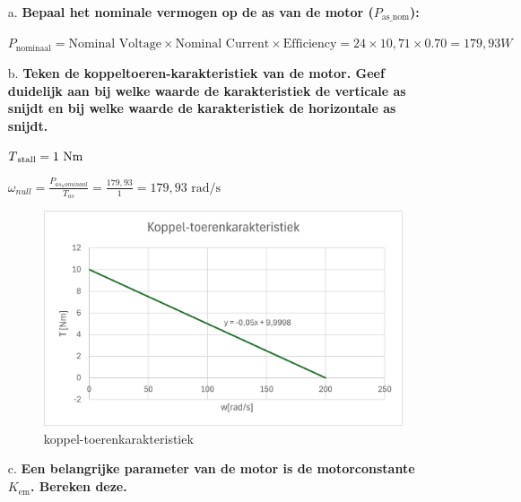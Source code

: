 \begin{enumerate}
    \item [a.] \textbf{Bepaal het nominale vermogen op de as van de motor ($P_{\text{as\_nom}}$):}
    
        $P_{\text{nominaal}} = \text{Nominal Voltage} \times \text{Nominal Current} \times \text{Efficiency} = 24 \times 10,71 \times 0.70 = 179,93W$



    \item [b.] \textbf{Teken de koppeltoeren-karakteristiek van de motor. Geef duidelijk aan bij
    welke waarde de karakteristiek de verticale as snijdt en bij welke waarde de
    karakteristiek de horizontale as snijdt.}


        $T\textsubscript{stall} = 1 \text{ Nm}$

        $\omega_{null} = \frac{P_{as_nominaal}}{T_{as}} = \frac{179,93}{1} = 179,93 \text{ rad/s}$

        \begin{figure}[h]
            \centering
            \includegraphics[scale=0.7]{koppel-toerenkarakteristiek 1b.png}
            \caption{koppel-toerenkarakteristiek}
        \end{figure}

    \item [c.] \textbf{Een belangrijke parameter van de motor is de motorconstante $K_{\text{em}}$.
    Bereken deze.}


\end{enumerate}
